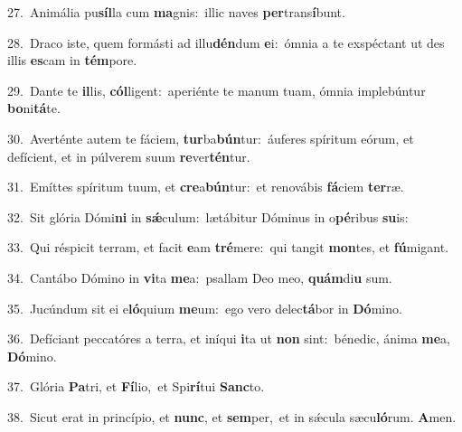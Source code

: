 {\numbfont\textcolor{\numbcolor}{27.}}~Animália pu\-\textbf{síl}\-la cum \textbf{ma}\-gnis:~\star illic naves \textbf{per}\-trans\-\textbf{í}\-bunt.\par
{\numbfont\textcolor{\numbcolor}{28.}}~Draco iste, quem formásti ad illu\-\textbf{dén}\-dum \textbf{e}\-i:~\star ómnia a te exspéctant ut des illis \textbf{es}\-cam in \textbf{tém}\-pore.\par
{\numbfont\textcolor{\numbcolor}{29.}}~Dante te \textbf{il}\-lis, \textbf{cól}\-ligent:~\star aperiénte te manum tuam, ómnia implebúntur \textbf{bo}\-ni\-\textbf{tá}\-te.\par
{\numbfont\textcolor{\numbcolor}{30.}}~Averténte autem te fáciem, \textbf{tur}\-ba\-\textbf{bún}\-tur:~\star áuferes spíritum eórum, et defícient, et in púlverem suum \textbf{re}\-ver\-\textbf{tén}\-tur.\par
{\numbfont\textcolor{\numbcolor}{31.}}~Emíttes spíritum tuum, et \textbf{cre}\-a\-\textbf{bún}\-tur:~\star et renovábis \textbf{fá}\-ciem \textbf{ter}\-ræ.\par
{\numbfont\textcolor{\numbcolor}{32.}}~Sit glória Dómi\textbf{ni} in \textbf{sǽ}\-culum:~\star lætábitur Dóminus in o\-\textbf{pé}\-ribus \textbf{su}\-is:\par
{\numbfont\textcolor{\numbcolor}{33.}}~Qui réspicit terram, et facit \textbf{e}\-am \textbf{tré}\-mere:~\star qui tangit \textbf{mon}\-tes, et \textbf{fú}\-migant.\par
{\numbfont\textcolor{\numbcolor}{34.}}~Cantábo Dómino in \textbf{vi}\-ta \textbf{me}\-a:~\star psallam Deo meo, \textbf{quám}\-di\textbf{u} sum.\par
{\numbfont\textcolor{\numbcolor}{35.}}~Jucúndum sit ei e\-\textbf{ló}\-quium \textbf{me}\-um:~\star ego vero delec\-\textbf{tá}\-bor in \textbf{Dó}\-mino.\par
{\numbfont\textcolor{\numbcolor}{36.}}~Defíciant peccatóres a terra, et iníqui \textbf{i}\-ta ut \textbf{non} sint:~\star bénedic, ánima \textbf{me}\-a, \textbf{Dó}\-mino.\par
{\numbfont\textcolor{\numbcolor}{37.}}~Glória \textbf{Pa}\-tri, et \textbf{Fí}\-lio,~\star et Spi\-\textbf{rí}\-tui \textbf{Sanc}\-to.\par
{\numbfont\textcolor{\numbcolor}{38.}}~Sicut erat in princípio, et \textbf{nunc}\-, et \textbf{sem}\-per,~\star et in sǽcula sæcu\-\textbf{ló}\-rum. \textbf{A}\-men.\par
